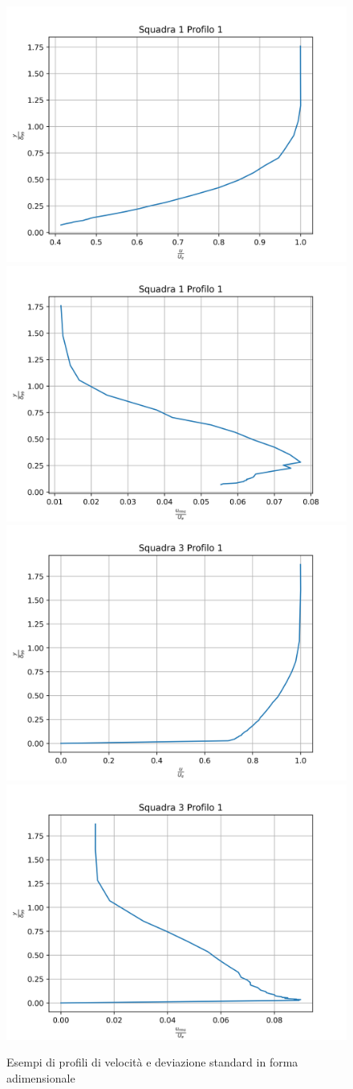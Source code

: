 \begin{figure}[H]
    \centering
    \includegraphics[width=.48\textwidth]{images/9/sq1p1_adim.png}
    \includegraphics[width=.48\textwidth]{images/9/sq1p1_rms_adim.png}
    \includegraphics[width=.48\textwidth]{images/9/sq3p1_adim.png}
    \includegraphics[width=.48\textwidth]{images/9/sq3p1_rms_adim.png}
    \caption{Esempi di profili di velocità e deviazione standard in forma adimensionale}
\end{figure}

